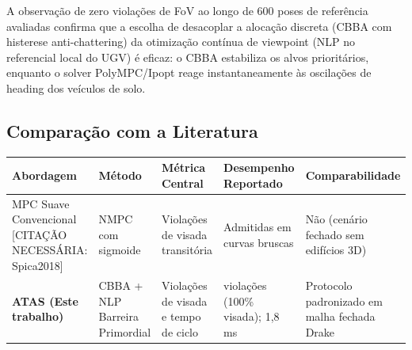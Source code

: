 \documentclass[
  brazilian,
  a4paper]{article}
\newcounter{none} %
\begin{document}
A observação de zero violações de FoV ao longo de 600 poses de
referência avaliadas confirma que a escolha de desacoplar a alocação
discreta (CBBA com histerese anti-chattering) da otimização contínua de
viewpoint (NLP no referencial local do UGV) é eficaz: o CBBA estabiliza
os alvos prioritários, enquanto o solver PolyMPC/Ipopt reage
instantaneamente às oscilações de heading dos veículos de solo.

\subsection{Comparação com a
Literatura}\label{comparauxe7uxe3o-com-a-literatura}

{\def\LTcaptype{none} %
\begin{longtable}[]{@{}
  >{\raggedright\arraybackslash}p{}
  >{\raggedright\arraybackslash}p{}
  >{\raggedright\arraybackslash}p{}
  >{\raggedright\arraybackslash}p{}
  >{\raggedright\arraybackslash}p{}@{}}
\toprule\noalign{}
\begin{minipage}[b]{\linewidth}\raggedright
Abordagem
\end{minipage} & \begin{minipage}[b]{\linewidth}\raggedright
Método
\end{minipage} & \begin{minipage}[b]{\linewidth}\raggedright
Métrica Central
\end{minipage} & \begin{minipage}[b]{\linewidth}\raggedright
Desempenho Reportado
\end{minipage} & \begin{minipage}[b]{\linewidth}\raggedright
Comparabilidade
\end{minipage} \\
\midrule\noalign{}
\endhead
\bottomrule\noalign{}
\endlastfoot
MPC Suave Convencional {[}CITAÇÃO NECESSÁRIA: Spica2018{]} & NMPC com
sigmoide & Violações de visada transitória & Admitidas em curvas bruscas
& Não (cenário fechado sem edifícios 3D) \\
\textbf{ATAS (Este trabalho)} & CBBA + NLP Barreira Primordial &
Violações de visada e tempo de ciclo & 0 violações (100\% visada); 1,8
ms & Protocolo padronizado em malha fechada Drake \\
\end{longtable}
}
\end{document}
